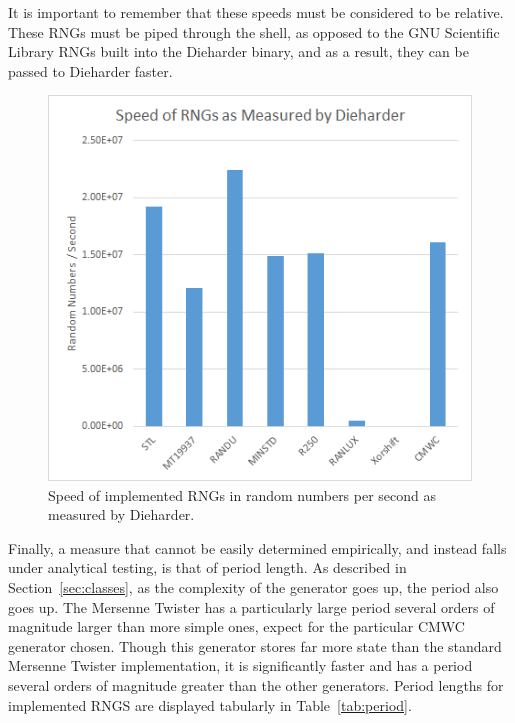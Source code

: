 It is important to remember that these speeds must be considered to be relative. These RNGs must be piped through the shell, as opposed to the GNU Scientific Library RNGs built into the Dieharder binary, and as a result, they can be passed to Dieharder faster.

\begin{figure}[tb]
    \begin{center}
        \includegraphics[width=\linewidth]{figures/speed.png}
    \end{center}
    \caption{Speed of implemented RNGs in random numbers per second as measured by Dieharder.}
    \label{fig:speed}
\end{figure}



Finally, a measure that cannot be easily determined empirically, and instead falls under analytical testing, is that of period length. As described in Section~\ref{sec:classes}, as the complexity of the generator goes up, the period also goes up. The Mersenne Twister has a particularly large period several orders of magnitude larger than more simple ones, expect for the particular CMWC generator chosen. Though this generator stores far more state than the standard Mersenne Twister implementation, it is significantly faster and has a period several orders of magnitude greater than the other generators. Period lengths for implemented RNGS are displayed tabularly in Table~\ref{tab:period}.


